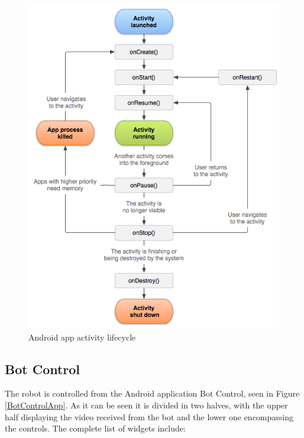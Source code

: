 	
	\begin{figure}[H]
      \centering
      \includegraphics[scale=.8]{images/Diagrams/android_activity_lifecycle.png}
      \caption{Android app activity lifecycle }
      \label{androidActivity}
  	\end{figure}
  	\bigskip




\newpage
\subsection{Bot Control}

The robot is controlled from the Android application Bot Control, seen in Figure \ref{BotControlApp}. As it can be seen it is divided in two halves, with the upper half displaying the video received from the bot and the lower one encompassing the controls. The complete list of widgets include:

